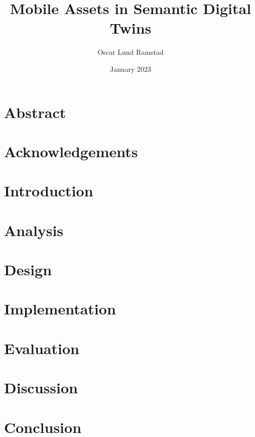 \documentclass{article}
\begin{document}
\title{Mobile Assets in Semantic Digital Twins}
\author{Oscar Lund Ramstad}
\date{January 2023}

\duoforside[dept={Institute for Informatics}, program={Informatics: Programming and System Architecture}, long]

\section*{Abstract}
\newpage

\section*{Acknowledgements}
\newpage

\tableofcontents
\newpage

\listoftables
\newpage

\listoffigures
\newpage

\setcounter{page}{1}


\section{Introduction}
\newpage

\section{Analysis}
\newpage

\section{Design}
\newpage

\section{Implementation}
\newpage

\section{Evaluation}
\newpage

\section{Discussion}
\newpage

\section{Conclusion}
\newpage

\printbibliography
\end{document}
